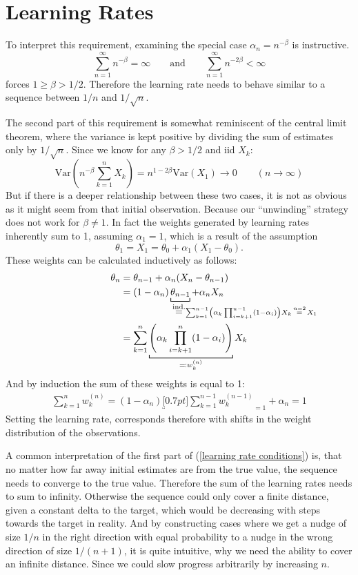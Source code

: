\section{Learning Rates}\label{learning rate}
To interpret this requirement, examining the special case \(\alpha_n=n^{-\beta}\) is instructive.
\[
    \sum_{n=1}^\infty n^{-\beta}=\infty \qquad \text{and}\qquad \sum_{n=1}^\infty n^{-2\beta}<\infty
\]
forces \(1\ge \beta >1/2\). Therefore the learning rate needs to behave similar to a sequence between \(1/n\) and \(1/\sqrt{n}\). 

The second part of this requirement is somewhat reminiscent of the central limit theorem, where the variance is kept positive by dividing the sum of estimates only by \(1/\sqrt{n}\). Since we know for any \(\beta>1/2\) and iid \(X_k\):
\[
    \text{Var}\left(n^{-\beta}\sum_{k=1}^n X_k \right)=n^{1-2\beta}\text{Var}(X_1)\to 0 \qquad (n\to \infty)
\]
But if there is a deeper relationship between these two cases, it is not as obvious as it might seem from that initial observation. Because our ``unwinding'' strategy does not work for \(\beta \neq 1\). In fact the weights generated by learning rates inherently sum to 1, assuming \(\alpha_1=1\), which is a result of the assumption 
\[
    \theta_1=X_1=\theta_0+\alpha_1(X_1-\theta_0).
\]
These weights can be calculated inductively as follows:
\begin{align*}
    \theta_n&=\theta_{n-1} + \alpha_n(X_n -\theta_{n-1})\\
    &=(1-\alpha_n)\underbracket[0.7pt]{\theta_{n-1}}_{
        \lxeq{\text{ind.}}
        \mathrlap{\sum_{k=1}^{n-1} \left(\alpha_k \prod_{i=k+1}^{n-1}(1-\alpha_i)\right)X_k \xeq{n=2} X_1}
    }
    + \alpha_n X_n\\
    & = \sum_{k=1}^n \underbracket[0.7pt]{
        \left(\alpha_k \prod_{i=k+1}^{n}(1-\alpha_i)\right)
        }_{
            \eqqcolon w_k^{(n)}
        } X_k
\end{align*}
And by induction the sum of these weights is equal to 1:
\begin{align*}
    \sum_{k=1}^n w_k^{(n)} = (1-\alpha_n)\underbracket[0.7pt]{\sum_{k=1}^{n-1}w_k^{(n-1)}}_{=1} + \alpha_n =1
\end{align*}
Setting the learning rate, corresponds therefore with shifts in the weight distribution of the observations.


A common interpretation of the first part of (\ref{learning rate conditions}) is, that no matter how far away initial estimates are from the true value, the sequence needs to converge to the true value. Therefore the sum of the learning rates needs to sum to infinity. Otherwise the sequence could only cover a finite distance, given a constant delta to the target, which would be decreasing with steps towards the target in reality. And by constructing cases where we get a nudge of size \(1/n\) in the right direction with equal probability to a nudge in the wrong direction of size \(1/(n+1)\), it is quite intuitive, why we need the ability to cover an infinite distance. Since we could slow progress arbitrarily by increasing \(n\). 

